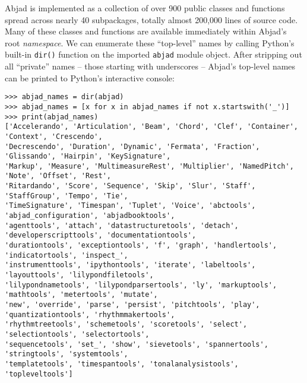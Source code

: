 \noindent Abjad is implemented as a collection of over 900 public classes and
functions spread across nearly 40 subpackages, totally almost 200,000 lines of
source code. Many of these classes and functions are available immediately
within Abjad's root \emph{namespace}. We can enumerate these
\enquote{top-level} names by calling Python's built-in \texttt{dir()} function
on the imported \texttt{abjad} module object. After stripping out all
\enquote{private} names -- those starting with underscores -- Abjad's top-level
names can be printed to Python's interactive console:

\begin{comment}
<abjad>[text_width=105]
abjad_names = dir(abjad)
abjad_names = [x for x in abjad_names if not x.startswith('_')]
print(abjad_names)
</abjad>
\end{comment}

\begin{abjadbookoutput}
\begin{singlespacing}
\vspace{-0.5\baselineskip}
\begin{lstlisting}
>>> abjad_names = dir(abjad)
>>> abjad_names = [x for x in abjad_names if not x.startswith('_')]
>>> print(abjad_names)
['Accelerando', 'Articulation', 'Beam', 'Chord', 'Clef', 'Container', 'Context', 'Crescendo',
'Decrescendo', 'Duration', 'Dynamic', 'Fermata', 'Fraction', 'Glissando', 'Hairpin', 'KeySignature',
'Markup', 'Measure', 'MultimeasureRest', 'Multiplier', 'NamedPitch', 'Note', 'Offset', 'Rest',
'Ritardando', 'Score', 'Sequence', 'Skip', 'Slur', 'Staff', 'StaffGroup', 'Tempo', 'Tie',
'TimeSignature', 'Timespan', 'Tuplet', 'Voice', 'abctools', 'abjad_configuration', 'abjadbooktools',
'agenttools', 'attach', 'datastructuretools', 'detach', 'developerscripttools', 'documentationtools',
'durationtools', 'exceptiontools', 'f', 'graph', 'handlertools', 'indicatortools', 'inspect_',
'instrumenttools', 'ipythontools', 'iterate', 'labeltools', 'layouttools', 'lilypondfiletools',
'lilypondnametools', 'lilypondparsertools', 'ly', 'markuptools', 'mathtools', 'metertools', 'mutate',
'new', 'override', 'parse', 'persist', 'pitchtools', 'play', 'quantizationtools', 'rhythmmakertools',
'rhythmtreetools', 'schemetools', 'scoretools', 'select', 'selectiontools', 'selectortools',
'sequencetools', 'set_', 'show', 'sievetools', 'spannertools', 'stringtools', 'systemtools',
'templatetools', 'timespantools', 'tonalanalysistools', 'topleveltools']
\end{lstlisting}
\end{singlespacing}
\end{abjadbookoutput}

